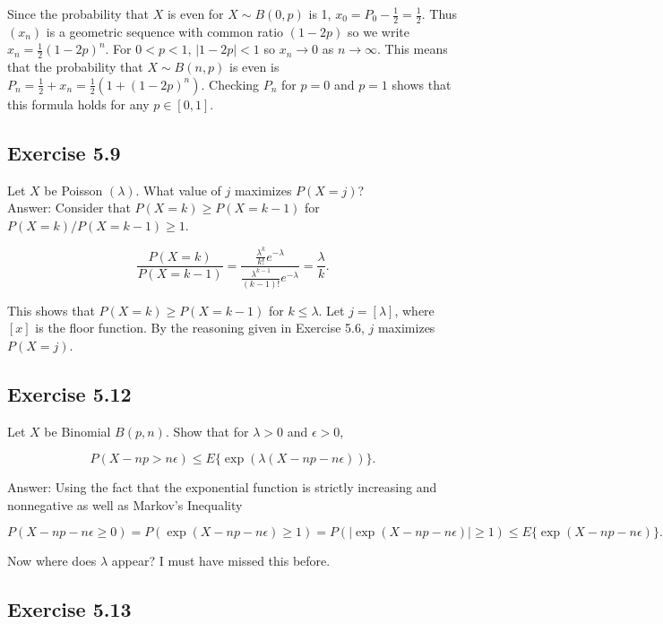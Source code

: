 \documentclass{article}
\begin{document}
Since the probability that $X$ is even for $X \sim B(0,p)$ is 1, $x_0 = P_0 - \frac{1}{2} = \frac{1}{2}$. Thus $(x_n)$ is a geometric sequence with common ratio $(1-2p)$ so we write $x_n = \frac{1}{2}(1-2p)^n$. For $0<p<1$, $|1-2p| < 1$ so $x_n \rightarrow 0$ as $n \rightarrow \infty$. This means that the probability that $X \sim B(n,p)$ is even is $P_n = \frac{1}{2} + x_n = \frac{1}{2}(1 +(1-2p)^n)$. Checking $P_n$ for $p = 0$ and $p=1$ shows that this formula holds for any $p \in [0,1]$. 

\subsection*{Exercise 5.9}

Let $X$ be Poisson $(\lambda)$. What value of $j$ maximizes $P(X = j)$?\\

Answer: Consider that $P(X = k) \geq P(X = k-1)$ for $P(X = k) / P(X = k-1) \geq 1$. 

$$
\frac{P(X = k)}{P(X = k-1)} = \frac{\frac{\lambda^k}{k!}e^{-\lambda}}{\frac{\lambda^{k-1}}{(k-1)!}e^{-\lambda}} = \frac{\lambda}{k}.
$$

This shows that $P(X = k) \geq P(X = k-1)$ for $k \leq \lambda$. Let $j = [\lambda]$, where $[x]$ is the floor function. By the reasoning given in Exercise 5.6, $j$ maximizes $P(X = j)$. 

\subsection*{Exercise 5.12}

Let $X$ be Binomial $B(p, n)$. Show that for $\lambda > 0$ and $\epsilon > 0$,

$$
P(X - np > n\epsilon) \leq E\{\exp(\lambda(X - np - n\epsilon))\}.
$$

Answer: Using the fact that the exponential function is strictly increasing and nonnegative as well as Markov's Inequality 

$$
P(X - np - n\epsilon \geq 0) =
P(\exp(X - np - n\epsilon) \geq 1)
=P(|\exp(X - np - n\epsilon)| \geq 1) 
\leq E\{\exp(X - np - n\epsilon)\}.
$$

Now where does $\lambda$ appear? I must have missed this before. 


\subsection*{Exercise 5.13}
\end{document}
